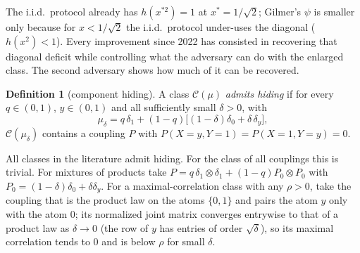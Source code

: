 \documentclass[11pt]{article}
\theoremstyle{definition}
\newtheorem{definition}[theorem]{Definition}
\newcommand{\cC}{\mathcal{C}}
\newcommand{\ent}{h}
\begin{document}
The i.i.d.\ protocol already has $\ent(x^{*2})=1$ at $x^*=1/\sqrt2$; Gilmer's $\psi$ is smaller only because for $x<1/\sqrt2$ the i.i.d.\ protocol under-uses the diagonal ($\ent(x^2)<1$). Every improvement since 2022 has consisted in recovering that diagonal deficit while controlling what the adversary can do with the enlarged class. The second adversary shows how much of it can be recovered.

\begin{definition}[component hiding]
A class $\cC(\mu)$ \emph{admits hiding} if for every $q\in(0,1)$, $y\in(0,1)$ and all sufficiently small $\delta>0$, with
\[\mu_\delta=q\,\delta_{1}+(1-q)\big[(1-\delta)\delta_{0}+\delta\,\delta_{y}\big],\]
$\cC(\mu_\delta)$ contains a coupling $P$ with $P(X=y,Y=1)=P(X=1,Y=y)=0$.
\end{definition}
All classes in the literature admit hiding. For the class of all couplings this is trivial. For mixtures of products take $P=q\,\delta_1\otimes\delta_1+(1-q)P_0\otimes P_0$ with $P_0=(1-\delta)\delta_0+\delta\delta_y$. For a maximal-correlation class with any $\rho>0$, take the coupling that is the product law on the atoms $\{0,1\}$ and pairs the atom $y$ only with the atom $0$; its normalized joint matrix converges entrywise to that of a product law as $\delta\to0$ (the row of $y$ has entries of order $\sqrt\delta$), so its maximal correlation tends to $0$ and is below $\rho$ for small $\delta$.
\end{document}
